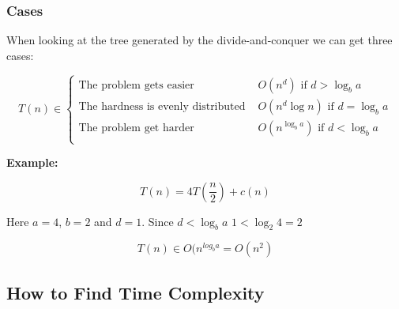 \subsubsection{Cases}

When looking at the tree generated by the divide-and-conquer we can get three cases:

\[
    T(n) \in
    \begin{cases}
        \text{The problem gets easier } &O(n^d) \text{ if } d > \log_b a \\
        \text{The hardness is evenly distributed } &O(n^d \log n) \text{ if } d = \log_b a \\
        \text{The problem get harder } &O(n^{\log_{b}a}) \text{ if } d < \log_b a \\
    \end{cases}
\]

\textbf{Example:}

\[
    T(n) = 4T (\frac{n}{2}) + c(n)
\]

Here \(a = 4\), \(b = 2\) and \(d = 1\). Since \(d < \log_b a\) \(1 < \log_2 4 = 2\) 

\[
    T(n) \in O(n^{log_b a} = O(n^2)
\]    


\subsection{How to Find Time Complexity}

